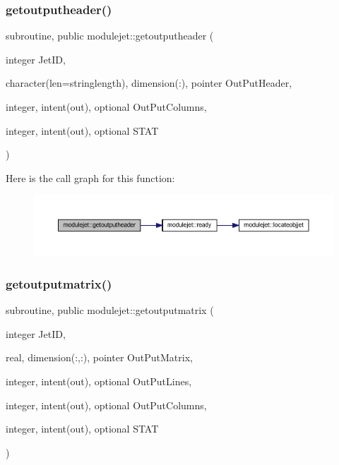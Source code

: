 \subsubsection{\texorpdfstring{getoutputheader()}{getoutputheader()}}
{\footnotesize\ttfamily subroutine, public modulejet\+::getoutputheader (\begin{DoxyParamCaption}\item[{integer}]{Jet\+ID,  }\item[{character(len=stringlength), dimension(\+:), pointer}]{Out\+Put\+Header,  }\item[{integer, intent(out), optional}]{Out\+Put\+Columns,  }\item[{integer, intent(out), optional}]{S\+T\+AT }\end{DoxyParamCaption})}

Here is the call graph for this function\+:\nopagebreak
\begin{figure}[H]
\begin{center}
\leavevmode
\includegraphics[width=350pt]{namespacemodulejet_af33eb9ee692e4270d09338bd74aa8851_cgraph}
\end{center}
\end{figure}
\mbox{\label{namespacemodulejet_a81ee4e71d54b53e9b3ab94bb817d66e8}} 
\subsubsection{\texorpdfstring{getoutputmatrix()}{getoutputmatrix()}}
{\footnotesize\ttfamily subroutine, public modulejet\+::getoutputmatrix (\begin{DoxyParamCaption}\item[{integer}]{Jet\+ID,  }\item[{real, dimension(\+:,\+:), pointer}]{Out\+Put\+Matrix,  }\item[{integer, intent(out), optional}]{Out\+Put\+Lines,  }\item[{integer, intent(out), optional}]{Out\+Put\+Columns,  }\item[{integer, intent(out), optional}]{S\+T\+AT }\end{DoxyParamCaption})}

